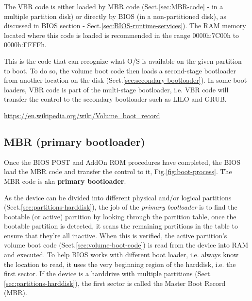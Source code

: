 The VBR code is either loaded by MBR code (Sect.\ref{sec:MBR-code} - in a
multiple partition disk) or directly by BIOS (in a non-partitioned disk), as
discussed in BIOS section - Sect.\ref{sec:BIOS-runtime-services}). The RAM
memory located where this code is loaded is recommended in the range 0000h:7C00h
to 0000h:FFFFh.

This is the code that can recognize what O/S is available on the given
partition to boot.
To do so, the volume boot code then loads a second-stage bootloader from another location
on the disk (Sect.\ref{sec:secondary-bootloader}). In some boot loaders, VBR
code is part of the multi-stage bootloader, i.e. VBR code will transfer the
control to the secondary bootloader such as LILO and GRUB.

\url{https://en.wikipedia.org/wiki/Volume_boot_record}



\subsection{MBR (primary bootloader)}
\label{sec:MBR}
\label{sec:bootable-device-and-MBR}
\label{sec:primary-bootloader-MBR}
\label{sec:MBR-code}

Once the BIOS POST and AddOn ROM procedures have completed, the BIOS load the
MBR code and transfer the control to it, Fig.\ref{fig:boot-process}.
The MBR code is aka {\bf primary bootloader}. 

As the device can be divided into different physical and/or logical partitions
(Sect.\ref{sec:partitions-harddisk}), the job of the {\it primary bootloader} is
to find the bootable (or active) partition by looking through the partition
table, once the bootable partition is detected, it scans the remaining
partitions in the table to ensure that they're all inactive. When this is
verified, the active partition's  volume boot code
(Sect.\ref{sec:volume-boot-code}) is read from the device into RAM and executed.
To help BIOS works with different boot loader, i.e. always know the location to
read, it uses the very beginning region of the harddisk, i.e. the first sector.
If the device is a harddrive with multiple partitions
(Sect.\ref{sec:partitions-harddisk}), the first sector is called the Master Boot
Record (MBR).

